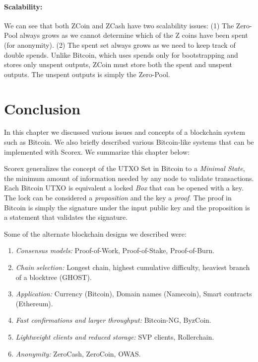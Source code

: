 \documentclass[]{report}   %
\begin{document}
\paragraph{Scalability:} We can see that both ZCoin and ZCash have two scalability issues: (1) The Zero-Pool always grows as we cannot determine which of the Z coins have been spent (for anonymity). (2) The spent set always grows as we need to keep track of double spends. Unlike Bitcoin, which uses spends only for bootstrapping and stores only unspent outputs, ZCoin must store both the spent and unspent outputs. The unspent outputs is simply the Zero-Pool.

\section{Conclusion}

In this chapter we discussed various issues and concepts of a blockchain system such as Bitcoin. We also briefly described various Bitcoin-like systems that can be implemented with Scorex. We summarize this chapter below:

Scorex generalizes the concept of the UTXO Set in Bitcoin to a {\em Minimal State}, the minimum amount of information needed by any node to validate transactions. Each Bitcoin UTXO is equivalent a locked {\em Box} that can be opened with a key. The lock can be considered a {\em proposition} and the key a {\em proof}. The proof in Bitcoin is simply the signature under the input public key and the proposition is a statement that validates the signature.

Some of the alternate blockchain designs we described were:

\begin{enumerate}
	\item {\em Consensus models:} Proof-of-Work, Proof-of-Stake, Proof-of-Burn.
	\item {\em Chain selection:} Longest chain, highest cumulative difficulty, heaviest branch of a blocktree (GHOST).
	\item {\em Application:} Currency (Bitcoin), Domain names (Namecoin), Smart contracts (Ethereum).
	\item {\em Fast confirmations and larger throughput:} Bitcoin-NG, ByzCoin.
	\item {\em Lightweight clients and reduced storage:} SVP clients, Rollerchain.
	\item {\em Anonymity:} ZeroCash, ZeroCoin, OWAS.
\end{enumerate}
\end{document}
